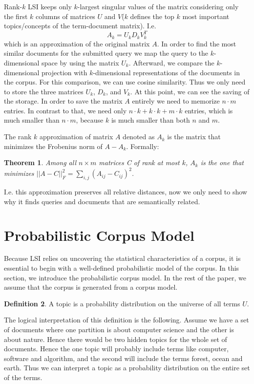 \documentclass[a4paper,11pt,DIV=15]{scrartcl} %
\theoremstyle{plain}
\newtheorem{theorem}{Theorem}
\theoremstyle{definition}
\newtheorem{definition}[theorem]{Definition}
\begin{document}
Rank-$k$ LSI keeps only $k$-largest singular values of the matrix considering only the first $k$ columns of matrices $U$ and $V$($k$ defines the top $k$ most important topics/concepts of the term-document matrix). I.e.
\[
A_k = U_kD_kV_k^T
\]
which is an approximation of the original matrix $A$. 
In order to find the most similar documents for the submitted query we map the query to the $k$-dimensional space by using the matrix $U_k$. Afterward, we compare the $k$-dimensional projection with $k$-dimensional representations of the documents in the corpus. For this comparison, we can use cosine similarity. Thus we only need to store the three matrices $U_k$, $D_k$, and $V_k$.
At this point, we can see the saving of the storage. In order to save the matrix $A$ entirely we need to memorize $n \cdot m$ entries. In contrast to that, we need only $n \cdot k + k\cdot k + m \cdot k$ entries, which is much smaller than  $n \cdot m$, because $k$ is much smaller than both $n$ and $m$.

The rank $k$ approximation of matrix $A$ denoted as $A_k$  is the matrix that minimizes the Frobenius norm of $A - A_k$. Formally:
\begin{theorem}
	\cite{EckartYoung} Among all $n \times m$ matrices C of rank at most $k$, $A_k$ is the one that minimizes $||A - C||_F^2 = \sum_{i,j}(A_{ij} - C_{ij})^2$.
\end{theorem}
I.e. this approximation preserves all relative distances, now we only need to show why it finds queries and documents that are semantically related.








 

\section{Probabilistic Corpus Model} %
Because LSI relies on uncovering the statistical characteristics of a corpus, it is essential to begin with a well-defined probabilistic model of the corpus.
In this section, we introduce the probabilistic corpus model.
In the rest of the paper, we assume that the corpus is generated from a corpus model.
\begin{definition}
A topic is a probability distribution on the universe of all terms $U$.
\end{definition}
The logical interpretation of this definition is the following. Assume we have a set of documents where one partition is about computer science and the other is about nature. Hence there would be two hidden topics for the whole set of documents.
Hence the one topic will probably include terms like computer, software and algorithm, and the second will include the terms forest, ocean and earth. Thus we can interpret a topic as a probability distribution on the entire set of the terms.
\end{document}
